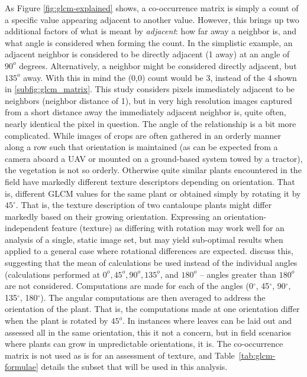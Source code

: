 \documentclass[letterpaper]{report}
\begin{document}
As Figure \ref{fig:glcm-explained} shows, a co-occurrence matrix is simply a count of a specific value appearing adjacent to another value. However, this brings up two additional factors of what is meant by \textit{adjacent}: how far away a neighbor is, and what angle is considered when forming the count. In the simplistic example, an adjacent neighbor is considered to be directly adjacent (1 away) at an angle of $90^o$ degrees. Alternatively, a neighbor might be considered directly adjacent, but $135^o$ away.  With this in mind the (0,0) count would be $3$, instead of the $4$ shown in \ref{subfig:glcm_matrix}. This study considers pixels immediately adjacent to be neighbors (neighbor distance of 1), but  in very high resolution images captured from a short distance away the immediately adjacent neighbor is, quite often, nearly identical the pixel in question. The angle of the relationship is a bit more complicated. While images of crops are often gathered in an orderly manner along a row such that orientation is maintained (as can be expected from a camera aboard a UAV or mounted on a ground-based system towed by a tractor), the vegetation is not so orderly. Otherwise quite similar plants encountered in the field have markedly different texture descriptors depending on orientation. That is, different GLCM values for the same plant or obtained simply by rotating it by $45^{\circ}$. That is, the texture description of two cantaloupe plants might differ markedly based on their growing orientation. Expressing an orientation-independent feature (texture) as differing with rotation may work well for an analysis of a single, static image set, but may yield sub-optimal results when applied to a general case where rotational differences are expected. \citeauthor*{Haralick1973-gr} discuss this, suggesting that the mean of calculations be used instead of the individual angles (calculations performed at $0^o, 45^o, 90^o, 135^o$, and $180^o$ -- angles greater than $180^o$ are not considered. Computations are made for each of the angles (0$^{\circ}$, 45$^{\circ}$, 90$^{\circ}$, 135$^{\circ}$, 180$^{\circ}$). The angular computations are then averaged to address the orientation of the plant. That is, the computations made at one orientation differ when the plant is rotated by $45^o$. In instances where leaves can be laid out and assessed all in the same orientation, this it not a concern, but in field scenarios where plants can grow in unpredictable orientations, it is. The co-occurrence matrix is not used as is for an assessment of texture, and Table~\ref{tab:glcm-formulae} details the subset that will be used in this analysis.
\end{document}
